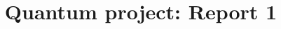\documentclass[11pt]{article}
\title{Quantum project: Report 1}
\author{}
\begin{document}
\maketitle

\end{document}
